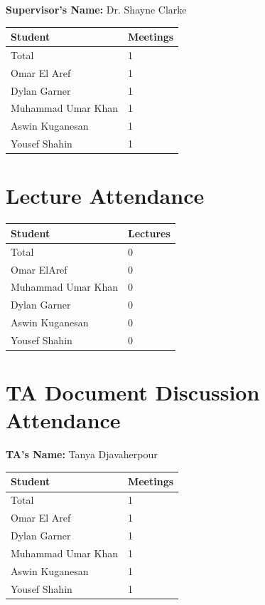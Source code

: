\documentclass{article}
\begin{document}
\noindent \textbf{Supervisor's Name: } Dr. Shayne Clarke 

\begin{table}[H]
\centering
\begin{tabular}{ll}
\toprule
\textbf{Student} & \textbf{Meetings}\\
\midrule
Total & 1\\
Omar El Aref & 1\\
Dylan Garner & 1\\
Muhammad Umar Khan & 1\\
Aswin Kuganesan & 1\\
Yousef Shahin & 1\\
\bottomrule
\end{tabular}
\end{table}

\section{Lecture Attendance}

\begin{table}[H]
\centering
\begin{tabular}{ll}
\toprule
\textbf{Student} & \textbf{Lectures}\\
\midrule
Total & 0\\
Omar ElAref & 0\\
Muhammad Umar Khan & 0\\
Dylan Garner & 0\\
Aswin Kuganesan  & 0\\
Yousef Shahin & 0\\
\bottomrule
\end{tabular}
\end{table}

\section{TA Document Discussion Attendance}

\noindent \textbf{TA's Name: } Tanya Djavaherpour

\begin{table}[H]
\centering
\begin{tabular}{ll}
\toprule
\textbf{Student} & \textbf{Meetings}\\
\midrule
Total & 1\\
Omar El Aref & 1\\
Dylan Garner & 1\\
Muhammad Umar Khan & 1\\
Aswin Kuganesan & 1\\
Yousef Shahin & 1\\
\bottomrule
\end{tabular}
\end{table}
\end{document}
